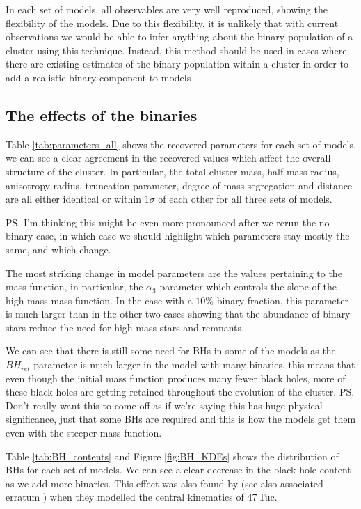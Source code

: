 In each set of models, all observables are very well reproduced, showing the flexibility of the
 models. Due to this flexibility, it is unlikely that with current observations we
would be able to infer anything about the binary population of a cluster using this technique.
Instead, this method should be used in cases where there are existing estimates of the binary
population within a cluster in order to add a realistic binary component to  models



\subsection{The effects of the binaries}


Table \ref{tab:parameters_all} shows the recovered parameters for each set of models, we can see a
clear agreement in the recovered values which affect the overall structure of the cluster. In
particular, the total cluster mass, half-mass radius, anisotropy radius, truncation parameter,
degree of mass segregation and distance are all either identical or within $1\sigma$ of each other
for all three sets of models.

\ps{I'm thinking this might be even more pronounced after we rerun the no binary case, in which case
	we should highlight which parameters stay mostly the same, and which change.}


The most striking change in model parameters are the values pertaining to the mass function, in
particular, the $\alpha_3$ parameter which controls the slope of the high-mass mass function. In the
case with a $10\%$ binary fraction, this parameter is much larger than in the other two cases
showing that the abundance of binary stars reduce the need for high mass stars and remnants.

We can see that there is still some need for BHs in some of the models as the $BH_{ret}$ parameter
is much larger in the model with many binaries, this means that even though the initial mass
function produces many fewer black holes, more of these black holes are getting retained throughout
the evolution of the cluster. \ps{Don't really want this to come off as if we're saying this has
	huge physical significance, just that some BHs are required and this is how the models get them even
	with the steeper mass function.}

Table \ref{tab:BH_contents} and Figure \ref{fig:BH_KDEs} shows the distribution of BHs for each set
of models. We can see a clear decrease in the black hole content as we add more binaries. This
effect was also found by \citet{Mann2019} (see also associated erratum \citealt{Mann2020}) when they
modelled the central kinematics of 47\,Tuc.

